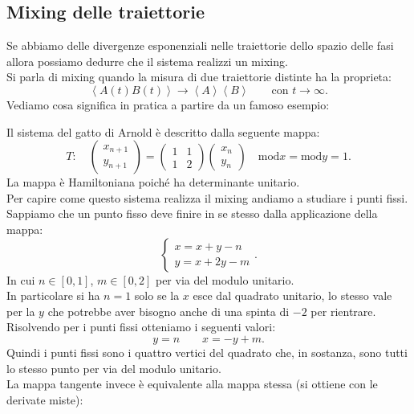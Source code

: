 \subsection{Mixing delle traiettorie}%
\label{sub:Mixing delle traiettorie}
Se abbiamo delle divergenze esponenziali nelle traiettorie dello spazio delle fasi allora possiamo dedurre che il sistema realizzi un mixing.\\
Si parla di mixing quando la misura di due traiettorie distinte ha la proprieta:
\[
    \left<A(t)B(t)\right> \to  \left<A\right>\left<B\right> \qquad \text{con } t\to \infty
.\] 
Vediamo cosa significa in pratica a partire da un famoso esempio:
\begin{exmp}
    Il sistema del gatto di Arnold è descritto dalla seguente mappa:
    \[
        T: \quad
	\begin{pmatrix} x_{n+1} \\ y_{n+1} \end{pmatrix}  = 
	\begin{pmatrix} 
	    1 & 1 \\
	    1 & 2
	\end{pmatrix} 
	\begin{pmatrix} x_n \\ y_n \end{pmatrix} 
	\quad \text{mod}x = \text{mod}y = 1
    .\]
    La mappa è Hamiltoniana poiché ha determinante unitario. \\
    Per capire come questo sistema realizza il mixing andiamo a studiare i punti fissi. Sappiamo che un punto fisso deve finire in se stesso dalla applicazione della mappa:
    \[
        \begin{cases}
            x = x+y -n \\
	    y = x + 2y - m
        \end{cases}
    .\] 
    In cui $n \in \left[0,1\right]$, $m \in \left[0,2\right]$ per via del modulo unitario.\\
    In particolare si ha $n=1$ solo se la $x$ esce dal quadrato unitario, lo stesso vale per la $y$ che potrebbe aver bisogno anche di una spinta di $-2$ per rientrare.\\
    Risolvendo per i punti fissi otteniamo i seguenti valori:
    \[
        y = n \qquad x = - y + m
    .\] 
    Quindi i punti fissi sono i quattro vertici del quadrato che, in sostanza, sono tutti lo stesso punto per via del modulo unitario.\\
    La mappa tangente invece è equivalente alla mappa stessa (si ottiene con le derivate miste):

\end{exmp}
